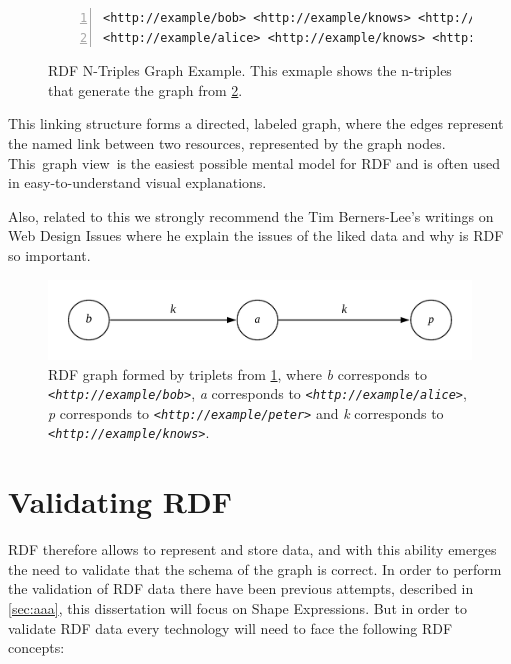\begin{figure}
\begin{lstlisting}[numbers=left, basicstyle=\ttfamily\scriptsize]
<http://example/bob> <http://example/knows> <http://example/alice> .
<http://example/alice> <http://example/knows> <http://example/peter> .
\end{lstlisting}
\caption[RDF N-Triples Graph Example]{RDF N-Triples Graph Example. This exmaple shows the n-triples
that generate the graph from \cref{fig:rdf-graph}.}
\label{fig:rdf-ntriples-graph}
\end{figure}

This linking structure forms a directed, labeled graph, where the edges represent the named link
between two resources, represented by the graph nodes. This graph view is the easiest possible
mental model for RDF and is often used in easy-to-understand visual explanations.

Also, related to this we strongly recommend the Tim Berners-Lee’s writings on Web Design Issues
\cite{semantic-roadmap} where he explain the issues of the liked data and why is RDF so important.

\begin{figure}
\includegraphics[scale=0.2]{images/shex-lite-rdf-graph.png}
\centering
\caption[RDF Example graph]{RDF graph formed by triplets from \cref{fig:rdf-ntriples-graph}, where
\textit{b} corresponds to \textit{\texttt{<http://example/bob>}}, \textit{a} corresponds to
\textit{\texttt{<http://example/alice>}}, \textit{p} corresponds to \textit{\texttt{<http://example/peter>}}
and \textit{k} corresponds to \textit{\texttt{<http://example/knows>}}.}
\label{fig:rdf-graph}
\end{figure}


\section{Validating RDF}
RDF therefore allows to represent and store data, and with this ability emerges the need to validate
that the schema of the graph is correct. In order to perform the validation of RDF data there  have
been previous attempts, described in \cref{sec:aaa}, this dissertation will focus
on Shape Expressions. But in order to validate RDF data every technology will need to face the following
RDF concepts:


